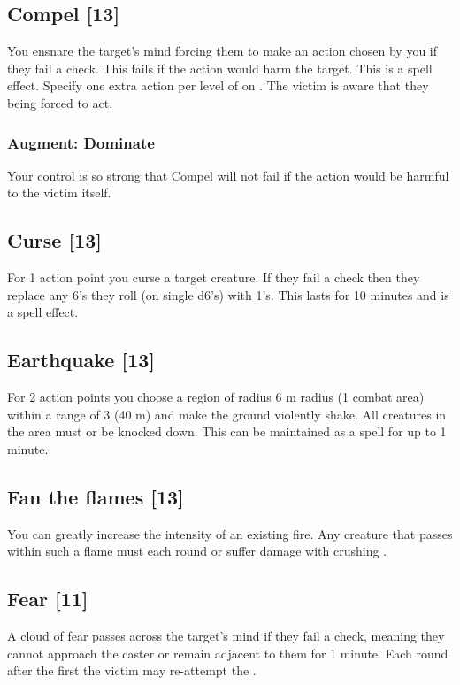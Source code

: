 \subsection{Compel [13]}
You ensnare the target's mind forcing them to make an action chosen by you if they fail a  check. This fails if the action would harm the target. This is a  spell effect. Specify one extra action per level of  on . The victim is aware that they being forced to act.
\subsubsection{Augment: Dominate}
Your control is so strong that Compel will not fail if the action would be harmful to the victim itself.

\subsection{Curse [13]}
For 1 action point you curse a target creature. If they fail a  check then they replace any 6's they roll (on single d6's) with 1's. This lasts for 10 minutes and  is a  spell effect.

\subsection{Earthquake [13]}
For 2 action points you choose a region of radius 6 m radius (1 combat area) within a range of 3 (40 m) and make the ground violently shake. All creatures in the area must  or be knocked down. This can be maintained as a  spell for up to 1 minute.

\subsection{Fan the flames [13]}
You can greatly increase the intensity of an existing fire. Any creature that passes within such a flame must  each round or suffer damage with crushing . 

\subsection{Fear [11]}
A cloud of fear passes across the target's mind if they fail a  check, meaning they cannot approach the caster or remain adjacent to them for 1 minute. Each round after the first the victim may re-attempt the . 
